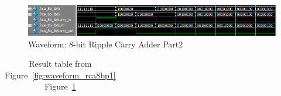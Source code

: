 \documentclass{report}
\begin{document}
            \begin{figure}[!htb]
                \centering
                \includegraphics[width=\textwidth]{diagrams/rca-8b-waveform-part2.PNG}
        
                \caption{Waveform: 8-bit Ripple Carry Adder Part2}
                \label{fig:waveform_rca8bp2}
            \end{figure}

            \begin{longtable}[here,width=\textwidth]{|c|c|c|c|c|c|}
                \caption{Result table from Figure~\ref{fig:waveform_rca8bp1} Figure~\ref{fig:waveform_rca8bp2} \label{fig:result_table}}      \\


\end{longtable}
\end{document}
